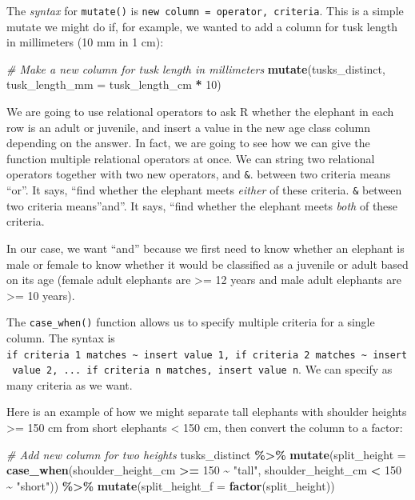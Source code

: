 \documentclass[
]{article}
\newenvironment{Shaded}{\begin{snugshade}}{\end{snugshade}}
\newcommand{\AttributeTok}[1]{\textcolor[rgb]{0.13,0.29,0.53}{#1}}
\newcommand{\CommentTok}[1]{\textcolor[rgb]{0.56,0.35,0.01}{\textit{#1}}}
\newcommand{\DecValTok}[1]{\textcolor[rgb]{0.00,0.00,0.81}{#1}}
\newcommand{\FunctionTok}[1]{\textcolor[rgb]{0.13,0.29,0.53}{\textbf{#1}}}
\newcommand{\NormalTok}[1]{#1}
\newcommand{\SpecialCharTok}[1]{\textcolor[rgb]{0.81,0.36,0.00}{\textbf{#1}}}
\newcommand{\StringTok}[1]{\textcolor[rgb]{0.31,0.60,0.02}{#1}}
\begin{document}
The \emph{syntax} for \texttt{mutate()} is
\texttt{new\ column\ =\ operator,\ criteria}. This is a simple mutate we
might do if, for example, we wanted to add a column for tusk length in
millimeters (10 mm in 1 cm):

\begin{Shaded}
\begin{Highlighting}[]
\CommentTok{\# Make a new column for tusk length in millimeters}
\FunctionTok{mutate}\NormalTok{(tusks\_distinct, }\AttributeTok{tusk\_length\_mm =}\NormalTok{ tusk\_length\_cm }\SpecialCharTok{*} \DecValTok{10}\NormalTok{)}
\end{Highlighting}
\end{Shaded}

We are going to use relational operators to ask R whether the elephant
in each row is an adult or juvenile, and insert a value in the new age
class column depending on the answer. In fact, we are going to see how
we can give the function multiple relational operators at once. We can
string two relational operators together with two new operators,
\texttt{\textbar{}} and \texttt{\&}. \texttt{\textbar{}} between two
criteria means ``or''. It says, ``find whether the elephant meets
\emph{either} of these criteria. \texttt{\&} between two criteria
means''and''. It says, ``find whether the elephant meets \emph{both} of
these criteria.

In our case, we want ``and'' because we first need to know whether an
elephant is male or female to know whether it would be classified as a
juvenile or adult based on its age (female adult elephants are
\textgreater= 12 years and male adult elephants are \textgreater= 10
years).

The \texttt{case\_when()} function allows us to specify multiple
criteria for a single column. The syntax is
\texttt{if\ criteria\ 1\ matches\ \textasciitilde{}\ insert\ value\ 1,\ if\ criteria\ 2\ matches\ \textasciitilde{}\ insert\ value\ 2,\ ...\ if\ criteria\ n\ matches,\ insert\ value\ n}.
We can specify as many criteria as we want.

Here is an example of how we might separate tall elephants with shoulder
heights \textgreater= 150 cm from short elephants \textless{} 150 cm,
then convert the column to a factor:

\begin{Shaded}
\begin{Highlighting}[]
\CommentTok{\# Add new column for two heights}
\NormalTok{tusks\_distinct }\SpecialCharTok{\%\textgreater{}\%}
  \FunctionTok{mutate}\NormalTok{(}\AttributeTok{split\_height =} \FunctionTok{case\_when}\NormalTok{(shoulder\_height\_cm }\SpecialCharTok{\textgreater{}=} \DecValTok{150} \SpecialCharTok{\textasciitilde{}} \StringTok{"tall"}\NormalTok{,}
\NormalTok{                                  shoulder\_height\_cm }\SpecialCharTok{\textless{}} \DecValTok{150} \SpecialCharTok{\textasciitilde{}} \StringTok{"short"}\NormalTok{)) }\SpecialCharTok{\%\textgreater{}\%}
  \FunctionTok{mutate}\NormalTok{(}\AttributeTok{split\_height\_f =} \FunctionTok{factor}\NormalTok{(split\_height))}
\end{Highlighting}
\end{Shaded}
\end{document}
